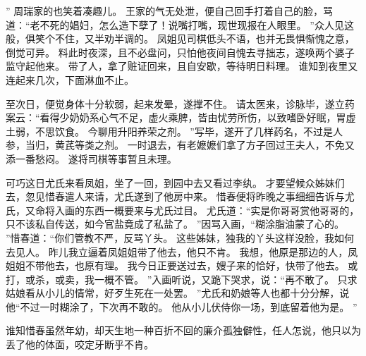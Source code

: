 ”
周瑞家的也笑着凑趣儿。
王家的气无处泄，便自己回手打着自己的脸，骂道：“老不死的娼妇，怎么造下孽了！说嘴打嘴，现世现报在人眼里。
”众人见这般，俱笑个不住，又半劝半调的。
凤姐见司棋低头不语，也并无畏惧惭愧之意，倒觉可异。
料此时夜深，且不必盘问，只怕他夜间自愧去寻拙志，遂唤两个婆子监守起他来。
带了人，拿了赃证回来，且自安歇，等待明日料理。
谁知到夜里又连起来几次，下面淋血不止。
\par
至次日，便觉身体十分软弱，起来发晕，遂撑不住。
请太医来，诊脉毕，遂立药案云：“看得少奶奶系心气不足，虚火乘脾，皆由忧劳所伤，以致嗜卧好眠，胃虚土弱，不思饮食。
今聊用升阳养荣之剂。
”写毕，遂开了几样药名，不过是人参，当归，黄芪等类之剂。
一时退去，有老嬷嬷们拿了方子回过王夫人，不免又添一番愁闷。
遂将司棋等事暂且未理。
\par
可巧这日尤氏来看凤姐，坐了一回，到园中去又看过李纨。
才要望候众姊妹们去，忽见惜春遣人来请，尤氏遂到了他房中来。
惜春便将昨晚之事细细告诉与尤氏，又命将入画的东西一概要来与尤氏过目。
尤氏道：“实是你哥哥赏他哥哥的，只不该私自传送，如今官盐竟成了私盐了。
”因骂入画，“糊涂脂油蒙了心的。
”惜春道：“你们管教不严，反骂丫头。
这些姊妹，独我的丫头这样没脸，我如何去见人。
昨儿我立逼着凤姐姐带了他去，他只不肯。
我想，他原是那边的人，凤姐姐不带他去，也原有理。
我今日正要送过去，嫂子来的恰好，快带了他去。
或打，或杀，或卖，我一概不管。
”入画听说，又跪下哭求，说：“再不敢了。
只求姑娘看从小儿的情常，好歹生死在一处罢。
”尤氏和奶娘等人也都十分分解，说他“不过一时糊涂了，下次再不敢的。
他从小儿伏侍你一场，到底留着他为是。
”\par
谁知惜春虽然年幼，却天生地一种百折不回的廉介孤独僻性，任人怎说，他只以为丢了他的体面，咬定牙断乎不肯。
